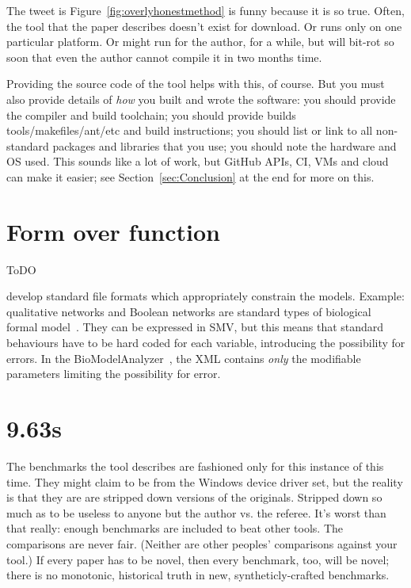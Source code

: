 \documentclass[conference]{IEEEtran}
\begin{document}
The tweet is Figure~\ref{fig:overlyhonestmethod} is funny because it
is so true. Often, the tool that the paper describes doesn't exist for
download. Or runs only on one particular platform. Or might run for
the author, for a while, but will bit-rot so soon that even the author
cannot compile it in two months time.

Providing the source code of the tool helps with this, of course. But
you must also provide details of \emph{how} you built and wrote the
software:
%
you should provide the compiler and build toolchain; 
%
you should provide builds tools/makefiles/ant/etc and build instructions; 
%
you should list or link to all non-standard packages and libraries that you use; 
%
you should note the hardware and OS used. 
%
This sounds like a lot of work, but GitHub APIs, CI, VMs and cloud can
make it easier; see Section~\ref{sec:Conclusion} at the end for more
on this.


\section{Form over function}

ToDO 

develop standard file formats which appropriately constrain the
models. Example: qualitative networks and Boolean networks are
standard types of biological formal
model~\cite{Kauffman1969,Schaub2007}. They can be expressed in SMV,
but this means that standard behaviours have to be hard coded for each
variable, introducing the possibility for errors. In the
BioModelAnalyzer~\cite{Benque2012}, the XML contains \emph{only} the
modifiable parameters limiting the possibility for error.


\section{9.63s} 

The benchmarks the tool describes are fashioned only for this instance
of this time. They might claim to be from the Windows device driver
set, but the reality is that they are are stripped down versions of
the originals. Stripped down so much as to be useless to anyone but
the author vs. the referee. It's worst than that really: enough
benchmarks are included to beat other tools. The comparisons are never
fair. (Neither are other peoples' comparisons against your tool.) If
every paper has to be novel, then every benchmark, too, will be novel;
there is no monotonic, historical truth in new, syntheticly-crafted
benchmarks.
\end{document}
